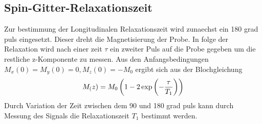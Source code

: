 \subsection{Spin-Gitter-Relaxationszeit}%
\label{sub:spin_gitter_relaxationszeit}
Zur bestimmung der Longitudinalen Relaxationszeit wird zunaechst ein 180 grad
puls eingesetzt. 
Dieser dreht die Magnetisierung der Probe.
In folge der Relaxation wird nach einer zeit $\tau$ ein zweiter Puls auf die
Probe gegeben um die restliche z-Komponente zu messen. 
Aus den Anfangsbedingungen $M_x(0) = M_y(0) =0, M_z(0)=-M_0$ ergibt sich aus der
Blochgleichung 
\begin{equation}
		\label{eq:magn}
		M_\text(z) = M_0 \left(1 - 2 \exp \left(- \frac{\tau}{T_1} \right)
		\right)
\end{equation}
Durch Variation der Zeit zwischen dem 90 und 180 grad puls kann durch Messung
des Signals die Relaxationszeit $T_1$ bestimmt werden.

